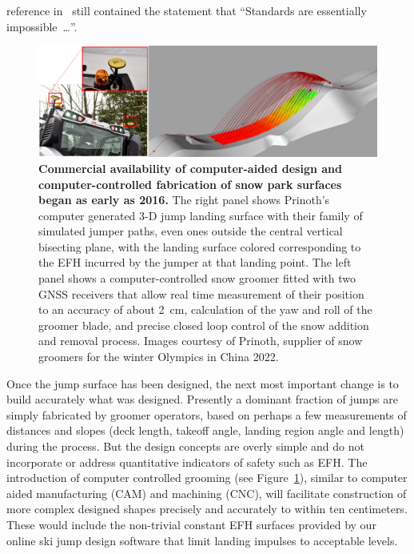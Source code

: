 \documentclass{article}
\begin{document}
reference in~\cite{NSAA2015} still contained the statement that ``Standards are
essentially impossible~\ldots''.
%
\begin{figure}
  \centering
  \includegraphics[width=\columnwidth]{figures/prinoth.png}
  \caption{\textbf{Commercial availability of computer-aided design and
    computer-controlled fabrication of snow park surfaces began as early as
    2016.} The right panel shows Prinoth's computer generated 3-D jump landing
    surface with their family of simulated jumper paths, even ones outside the
    central vertical bisecting plane, with the landing surface colored
    corresponding to the EFH incurred by the jumper at that landing point. The
    left panel shows a computer-controlled snow groomer fitted with two GNSS
    receivers that allow real time measurement of their position to an accuracy
    of about 2~\si{\centi\meter}, calculation of the yaw and roll of the
    groomer blade, and precise closed loop control of the snow addition and
    removal process.  Images courtesy of Prinoth, supplier of snow groomers for
  the winter Olympics in China 2022.}
  \label{fig:prinoth}
\end{figure}

Once the jump surface has been designed, the next most important change is to
build accurately what was designed. Presently a dominant fraction of jumps are
simply fabricated by groomer operators, based on perhaps a few measurements of
distances and slopes (deck length, takeoff angle, landing region angle and
length) during the process. But the design concepts are overly simple and do
not incorporate or address quantitative indicators of safety such as EFH. The
introduction of computer controlled grooming (see Figure~\ref{fig:prinoth}),
similar to computer aided manufacturing (CAM) and machining (CNC), will
facilitate construction of more complex designed shapes precisely and
accurately to within ten centimeters. These would include the non-trivial
constant EFH surfaces provided by our online ski jump design software that
limit landing impulses to acceptable levels.
\end{document}
